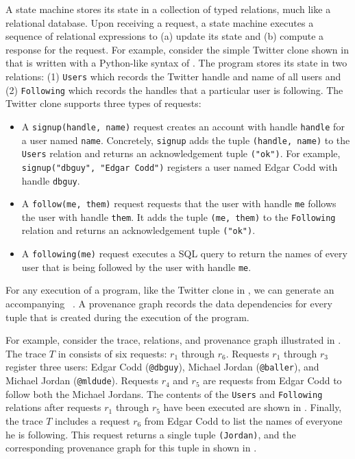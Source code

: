 A \dedalusplus{} state machine stores its state in a collection of typed
relations, much like a relational database. Upon receiving a request, a
\dedalusplus{} state machine executes a sequence of relational expressions to
(a) update its state and (b) compute a response for the request. For example,
consider the simple Twitter clone shown in  that is
written with a Python-like syntax of \dedalusplus{}. The program stores its
state in two relations: (1) \texttt{Users} which records the Twitter handle and
name of all users and (2) \texttt{Following} which records the handles that a
particular user is following. The Twitter clone supports three types of
requests:
\begin{itemize}
  \item
    A \texttt{signup(handle, name)} request creates an account with handle
    \texttt{handle} for a user named \texttt{name}.  Concretely,
    \texttt{signup} adds the tuple \texttt{(handle, name)} to the
    \texttt{Users} relation and returns an acknowledgement tuple
    \texttt{("ok")}. For example, \texttt{signup("dbguy", "Edgar Codd")}
    registers a user named Edgar Codd with handle \texttt{dbguy}.
  \item
    A \texttt{follow(me, them)} request requests that the user with handle
    \texttt{me} follows the user with handle \texttt{them}. It adds the tuple
    \texttt{(me, them)} to the \texttt{Following} relation and returns an
    acknowledgement tuple \texttt{("ok")}.
  \item
    A \texttt{following(me)} request executes a SQL query to return the names
    of every user that is being followed by the user with handle \texttt{me}.
\end{itemize}

For any execution of a \dedalusplus{} program, like the Twitter clone in
, we can generate an accompanying ~\cite{alvaro2015lineage}. A provenance graph records the data
dependencies for every tuple that is created during the execution of the
program.

{}

For example, consider the trace, relations, and provenance graph illustrated in
. The trace $T$ in 
consists of six requests: $r_1$ through $r_6$. Requests $r_1$ through $r_3$
register three users: Edgar Codd (\texttt{@dbguy}), Michael Jordan
(\texttt{@baller}), and Michael Jordan (\texttt{@mldude}). Requests $r_4$ and
$r_5$ are requests from Edgar Codd to follow both the Michael Jordans.  The
contents of the \texttt{Users} and \texttt{Following} relations after requests
$r_1$ through $r_5$ have been executed are shown in
. Finally, the trace $T$ includes a request $r_6$
from Edgar Codd to list the names of everyone he is following. This request
returns a single tuple \texttt{(Jordan)}, and the corresponding provenance
graph for this tuple in shown in .

